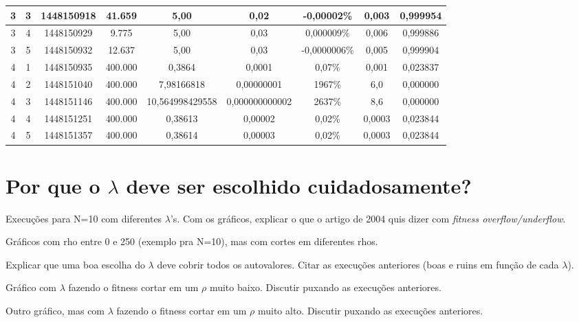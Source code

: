 \begin{landscape}
\begin{center}
\begin{table}[htbp]
\begin{tabular}{ccccccccc}
\hline
         3 &          3 & 1448150918 &     41.659 &       5,00 &       0,02 & -0,00002\% &      0,003 &   0,999954 \\
\hline
         3 &          4 & 1448150929 &      9.775 &       5,00 &       0,03 & 0,000009\% &      0,006 &   0,999886 \\
\hline
         3 &          5 & 1448150932 &     12.637 &       5,00 &       0,03 & -0,0000006\% &      0,005 &   0,999904 \\
\hline \hline
         4 &          1 & 1448150935 &    400.000 &     0,3864 &     0,0001 &     0,07\% &      0,001 &   0,023837 \\
\hline
         4 &          2 & 1448151040 &    400.000 & 7,98166818 & 0,00000001 &     1967\% &        6,0 &   0,000000 \\
\hline
         4 &          3 & 1448151146 &    400.000 & 10,564998429558 & 0,000000000002 &     2637\% &        8,6 &   0,000000 \\
\hline
         4 &          4 & 1448151251 &    400.000 &    0,38613 &    0,00002 &     0,02\% &     0,0003 &   0,023844 \\
\hline
         4 &          5 & 1448151357 &    400.000 &    0,38614 &    0,00003 &     0,02\% &     0,0003 &   0,023844 \\
\hline \hline
\end{tabular}  
\end{table}
\end{center}	
\end{landscape}
		
	\section{Por que o $\lambda$ deve ser escolhido cuidadosamente?}
	
	Execuções para N=10 com diferentes $\lambda$'s. Com os gráficos, explicar o que o artigo de 2004 quis dizer com \textit{fitness overflow/underflow}.
	
	Gráficos com rho entre 0 e 250 (exemplo pra N=10), mas com cortes em diferentes rhos.

	Explicar que uma boa escolha do $\lambda$ deve cobrir todos os autovalores. Citar as execuções anteriores (boas e ruins em função de cada $\lambda$).
	
	Gráfico com $\lambda$ fazendo o fitness cortar em um $\rho$ muito baixo. Discutir puxando as execuções anteriores.
	
	Outro gráfico, mas com $\lambda$ fazendo o fitness cortar em um $\rho$ muito alto. Discutir puxando as execuções anteriores.
	
